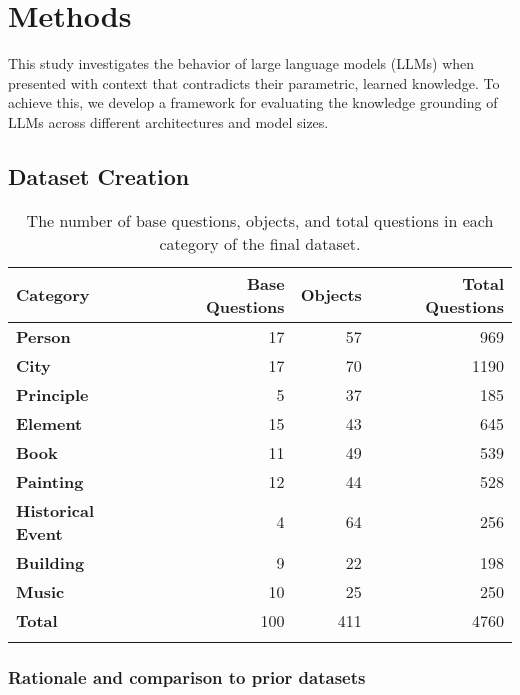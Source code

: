 \section{Methods}
\label{methodology_section}

This study investigates the behavior of large language models (LLMs) when presented with context that contradicts their parametric, learned knowledge.
To achieve this, we develop a framework for evaluating the knowledge grounding of LLMs across different architectures and model sizes.

\subsection{Dataset Creation}
\label{dataset_creation}

\begin{table}[t]
	\caption{The number of base questions, objects, and total questions in each category of the final dataset.}
	\label{category_amounts}
	\centering
	\footnotesize
	\begin{tabular}{>{\bfseries}l r r r}
		\toprule
			\bfseries Category & \bfseries Base Questions & \bfseries Objects & \bfseries Total Questions \\
		\midrule
			Person & 17 & 57 & 969 \\
			City & 17 & 70 & 1190 \\
			Principle & 5 & 37 & 185 \\
			Element & 15 & 43 & 645 \\
			Book & 11 & 49 & 539 \\
			Painting & 12 & 44 & 528 \\
			Historical Event & 4 & 64 & 256 \\
			Building & 9 & 22 & 198 \\
			Music & 10 & 25 & 250 \\
		\midrule
			Total & 100 & 411 & 4760 \\
		\bottomrule \addlinespace[4pt]
	\end{tabular}
\end{table}

\subsubsection{Rationale and comparison to prior datasets}

